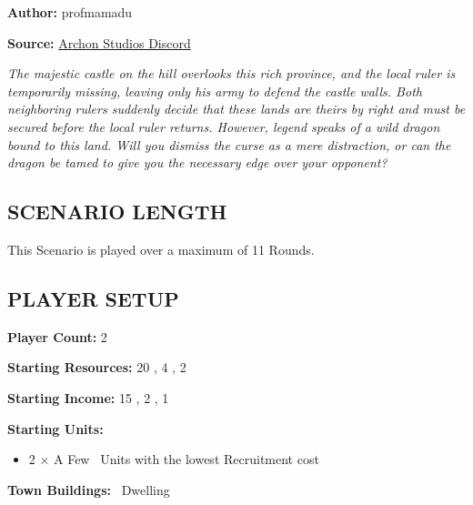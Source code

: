 
\begin{multicols*}{2}

\textbf{Author:} profmamadu

\textbf{Source:} \href{https://discord.com/channels/740870068178649108/1253016693517717714/1253016693517717714}{Archon Studios Discord}

\textit{The majestic castle on the hill overlooks this rich province, and the local ruler is temporarily missing, leaving only his army to defend the castle walls.
Both neighboring rulers suddenly decide that these lands are theirs by right and must be secured before the local ruler returns.
However, legend speaks of a wild dragon bound to this land.
Will you dismiss the curse as a mere distraction, or can the dragon be tamed to give you the necessary edge over your opponent?
}

\subsection*{\MakeUppercase{Scenario Length}}

This Scenario is played over a maximum of 11 Rounds.

\subsection*{\MakeUppercase{Player Setup}}

\textbf{Player Count:} 2

\textbf{Starting Resources:} 20 , 4 , 2 

\textbf{Starting Income:} 15 , 2 , 1 

\textbf{Starting Units:}
\begin{itemize}
  \item 2 × A Few \bronze\ Units with the lowest Recruitment cost
\end{itemize}

\textbf{Town Buildings:} \bronze\ Dwelling

\vfill
\begin{center}
\end{center}

\columnbreak

\end{multicols*}
